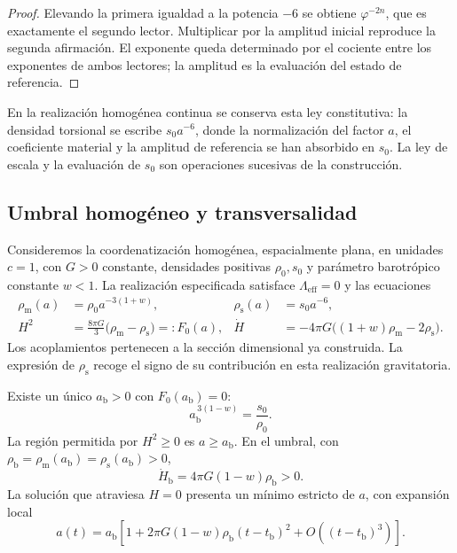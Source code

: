 \begin{proof}
Elevando la primera igualdad a la potencia \(-6\) se obtiene
\(\varphi^{-2n}\), que es exactamente el segundo lector. Multiplicar
por la amplitud inicial reproduce la segunda afirmación. El exponente
queda determinado por el cociente entre los exponentes de ambos
lectores; la amplitud es la evaluación del estado de referencia.
\end{proof}

En la realización homogénea continua se conserva esta ley constitutiva:
la densidad torsional se escribe \(s_0a^{-6}\), donde la normalización
del factor \(a\), el coeficiente material y la amplitud de referencia
se han absorbido en \(s_0\). La ley de escala y la evaluación de
\(s_0\) son operaciones sucesivas de la construcción.

\subsection{Umbral homogéneo y transversalidad}
\label{vii:sec:umbral-rebote}

Consideremos la coordenatización homogénea, espacialmente plana, en unidades \(c=1\),
con \(G>0\) constante, densidades positivas \(\rho_0,s_0\) y parámetro
barotrópico constante \(w<1\). La realización especificada satisface
\(\Lambda_{\mathrm{eff}}=0\) y las ecuaciones
\begin{align}
 \rho_{\mathrm m}(a)&=\rho_0a^{-3(1+w)},&
 \rho_{\mathrm s}(a)&=s_0a^{-6},\\
 H^2&=\frac{8\pi G}{3}
        \bigl(\rho_{\mathrm m}-\rho_{\mathrm s}\bigr)
        =:F_0(a),&
 \dot H&=-4\pi G
        \bigl((1+w)\rho_{\mathrm m}-2\rho_{\mathrm s}\bigr).
 \label{vii:eq:dinamica-homogenea}
\end{align}
Los acoplamientos pertenecen a la sección dimensional ya construida.
La expresión de \(\rho_{\mathrm s}\) recoge el signo de su contribución
en esta realización gravitatoria.

\begin{theorem}
\label{vii:thm:rebote}
Existe un único \(a_{\mathrm b}>0\) con \(F_0(a_{\mathrm b})=0\):
\[
 a_{\mathrm b}^{\,3(1-w)}=\frac{s_0}{\rho_0}.
\]
La región permitida por \(H^2\geq0\) es \(a\geq a_{\mathrm b}\).
En el umbral, con
\(\rho_{\mathrm b}=\rho_{\mathrm m}(a_{\mathrm b})
                  =\rho_{\mathrm s}(a_{\mathrm b})>0\),
\[
 \dot H_{\mathrm b}=4\pi G(1-w)\rho_{\mathrm b}>0.
\]
La solución que atraviesa \(H=0\) presenta un mínimo estricto de \(a\),
con expansión local
\[
 a(t)=a_{\mathrm b}\left[
 1+2\pi G(1-w)\rho_{\mathrm b}(t-t_{\mathrm b})^2
 +O((t-t_{\mathrm b})^3)\right].
\]
\end{theorem}

